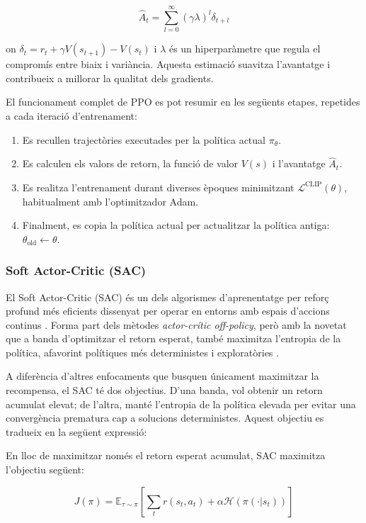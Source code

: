 \documentclass[12pt,a4paper,twoside]{book}
\begin{document}
\begin{equation}
\hat{A}_t = \sum_{l=0}^{\infty} (\gamma \lambda)^l \delta_{t+l}
\end{equation}

on $\delta_t = r_t + \gamma V(s_{t+1}) - V(s_t)$ i $\lambda$ és un hiperparàmetre que regula el compromís entre biaix i variància. Aquesta estimació suavitza l'avantatge i contribueix a millorar la qualitat dels gradients.


El funcionament complet de PPO es pot resumir en les següents etapes, repetides a cada iteració d'entrenament:
\begin{enumerate}
  \item Es recullen trajectòries executades per la política actual $\pi_\theta$.
  \item Es calculen els valors de retorn, la funció de valor $V(s)$ i l'avantatge $\hat{A}_t$.
  \item Es realitza l'entrenament durant diverses èpoques minimitzant $\mathcal{L}^{\text{CLIP}}(\theta)$, habitualment amb l'optimitzador Adam.
  \item Finalment, es copia la política actual per actualitzar la política antiga: $\theta_{\text{old}} \leftarrow \theta$.
\end{enumerate}


\subsubsection{Soft Actor-Critic (SAC)}

El Soft Actor-Critic (SAC) és un dels algorismes d'aprenentatge per reforç profund més eficients dissenyat per operar en entorns amb espais d'accions continus \cite{Haarnoja2018}. Forma part dels mètodes \textit{actor-crític off-policy}, però amb la novetat que a banda d'optimitzar el retorn esperat, també maximitza l'entropia de la política, afavorint polítiques més deterministes i exploratòries \cite{M11}.

A diferència d'altres enfocaments que busquen únicament maximitzar la recompensa, el SAC té dos objectius. D'una banda, vol obtenir un retorn acumulat elevat; de l'altra, manté l'entropia de la política elevada per evitar una convergència prematura cap a solucions deterministes. Aquest objectiu es tradueix en la següent expressió:

En lloc de maximitzar només el retorn esperat acumulat, SAC maximitza l'objectiu següent:

\begin{equation}
J(\pi) = \mathbb{E}_{\tau \sim \pi} \left[ \sum_t r(s_t, a_t) + \alpha \mathcal{H}(\pi(\cdot|s_t)) \right]
\end{equation}
\end{document}
